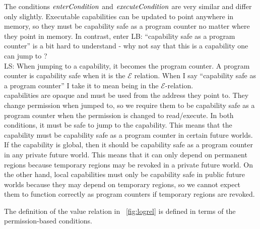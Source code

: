 \documentclass[compsoc,conference,letterpaper,fleqn]{IEEEtran}
\newcommand\lau[1]{{\color{purple} \sf \footnotesize {LS: #1}}\\}
\newcommand\lars[1]{{\color{purple} \sf \footnotesize {LB: #1}}\\}
\newcommand{\plainfun}[2]{
  \ifthenelse{\equal{#2}{}}
  {\mathit{#1}}
  {\mathit{#1}(#2)}
}
\newcommand{\execCond}[1]{\plainfun{executeCondition}{#1}}
\newcommand{\entryCond}[1]{\plainfun{enterCondition}{#1}}
\newcommand{\asmType}{\plaindom{AsmType}}
\newcommand{\plaindom}[1]{\mathrm{#1}}
\newcommand{\intr}[2]{\mathcal{#1}}
\newcommand{\exprintr}[1]{\intr{E}{#1}}
\newcommand{\stder}{\exprintr{\asmType}}
\begin{document}
The conditions $\entryCond{}$ and $\execCond{}$ are very similar and
differ only slightly. Executable capabilities can be updated to point
anywhere in memory, so they must be capability safe as a program
counter no matter where they point in memory. In contrast, enter
\lars{``capability safe as a program counter'' is a bit hard to
  understand - why not say that this is a capability one can jump to ?}
\lau{ When jumping to a capability, it becomes the program counter. A program counter is capability safe when it is the $\stder$ relation. When I say ``capability safe as a program counter'' I take it to mean being in the $\stder$-relation. }
capabilities are opaque and must be used from the address they point
to. They change permission when jumped to, so we require them to be
capability safe as a program counter when the permission is changed to
read/execute.
In both conditions, it must be safe to jump to the capability. This
means that the capability must be capability safe as a
program counter in certain future worlds. If the capability is global,
then it should be capability safe as a program counter in any private
future world. This means that it can only depend on permanent regions
because temporary regions may be revoked in a private future
world. On the other hand, local capabilities must only be capability
safe in public future worlds because they may depend on temporary
regions, so we cannot expect them to function correctly as program
counters if temporary regions are revoked.

The definition of the value relation in \figurename~\ref{fig:logrel}
is defined in terms of the permission-based conditions.
\end{document}
